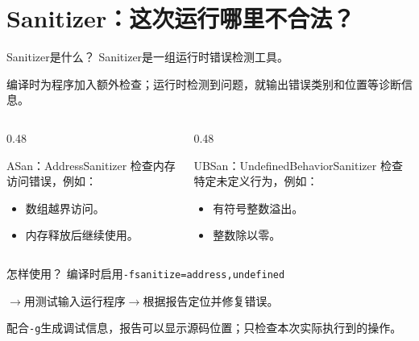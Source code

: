 \section{Sanitizer：这次运行哪里不合法？}

\begin{frame}{Sanitizer是什么？}
    \alert{Sanitizer是一组运行时错误检测工具。}
    \par 编译时为程序加入额外检查；运行时检测到问题，就输出错误类别和位置等诊断信息。
    \medskip
    \begin{columns}[T]
        \begin{column}{0.48\textwidth}
            \begin{block}{ASan：AddressSanitizer}
                检查内存访问错误，例如：
                \begin{itemize}
                    \item 数组越界访问。
                    \item 内存释放后继续使用。
                \end{itemize}
            \end{block}
        \end{column}
        \begin{column}{0.48\textwidth}
            \begin{block}{UBSan：UndefinedBehaviorSanitizer}
                检查特定未定义行为，例如：
                \begin{itemize}
                    \item 有符号整数溢出。
                    \item 整数除以零。
                \end{itemize}
            \end{block}
        \end{column}
    \end{columns}
    \medskip
    \begin{vspquotered}{怎样使用？}
        编译时启用\texttt{-fsanitize=address,undefined}\par
        $\longrightarrow$用测试输入运行程序$\longrightarrow$根据报告定位并修复错误。
    \end{vspquotered}
    \small 配合\texttt{-g}生成调试信息，报告可以显示源码位置；只检查本次实际执行到的操作。
\end{frame}

